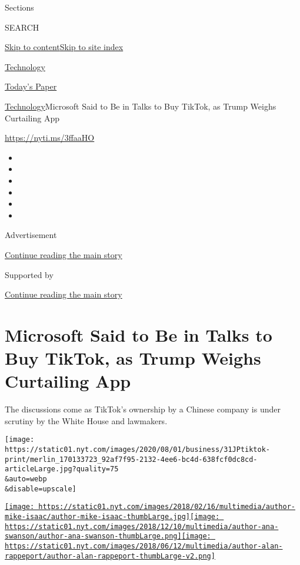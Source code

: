 Sections

SEARCH

\protect\hyperlink{site-content}{Skip to
content}\protect\hyperlink{site-index}{Skip to site index}

\href{https://www.nytimes.com/section/technology}{Technology}

\href{https://myaccount.nytimes.com/auth/login?response_type=cookie\&client_id=vi}{}

\href{https://www.nytimes.com/section/todayspaper}{Today's Paper}

\href{/section/technology}{Technology}\textbar{}Microsoft Said to Be in
Talks to Buy TikTok, as Trump Weighs Curtailing App

\url{https://nyti.ms/3ffaaHO}

\begin{itemize}
\item
\item
\item
\item
\item
\item
\end{itemize}

Advertisement

\protect\hyperlink{after-top}{Continue reading the main story}

Supported by

\protect\hyperlink{after-sponsor}{Continue reading the main story}

\hypertarget{microsoft-said-to-be-in-talks-to-buy-tiktok-as-trump-weighs-curtailing-app}{%
\section{Microsoft Said to Be in Talks to Buy TikTok, as Trump Weighs
Curtailing
App}\label{microsoft-said-to-be-in-talks-to-buy-tiktok-as-trump-weighs-curtailing-app}}

The discussions come as TikTok's ownership by a Chinese company is under
scrutiny by the White House and lawmakers.

\texttt{[image: https://static01.nyt.com/images/2020/08/01/business/31JPtiktok-print/merlin\_170133723\_92af7f95-2132-4ee6-bc4d-638fcf0dc8cd-articleLarge.jpg?quality=75\\\&auto=webp\\\&disable=upscale]}

\href{https://www.nytimes.com/by/mike-isaac}{\texttt{[image: https://static01.nyt.com/images/2018/02/16/multimedia/author-mike-isaac/author-mike-isaac-thumbLarge.jpg]}}\href{https://www.nytimes.com/by/ana-swanson}{\texttt{[image: https://static01.nyt.com/images/2018/12/10/multimedia/author-ana-swanson/author-ana-swanson-thumbLarge.png]}}\href{https://www.nytimes.com/by/alan-rappeport}{\texttt{[image: https://static01.nyt.com/images/2018/06/12/multimedia/author-alan-rappeport/author-alan-rappeport-thumbLarge-v2.png]}}

